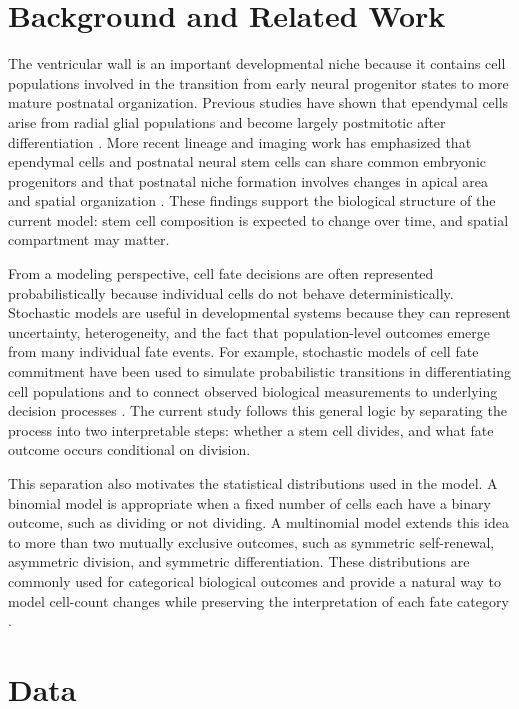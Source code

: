\documentclass[12pt]{article}
\begin{document}
\section{Background and Related Work}

The ventricular wall is an important developmental niche because it contains cell populations involved in the transition from early neural progenitor states to more mature postnatal organization. Previous studies have shown that ependymal cells arise from radial glial populations and become largely postmitotic after differentiation \citep{Spassky2005}. More recent lineage and imaging work has emphasized that ependymal cells and postnatal neural stem cells can share common embryonic progenitors and that postnatal niche formation involves changes in apical area and spatial organization \citep{Redmond2019}. These findings support the biological structure of the current model: stem cell composition is expected to change over time, and spatial compartment may matter.

From a modeling perspective, cell fate decisions are often represented probabilistically because individual cells do not behave deterministically. Stochastic models are useful in developmental systems because they can represent uncertainty, heterogeneity, and the fact that population-level outcomes emerge from many individual fate events. For example, stochastic models of cell fate commitment have been used to simulate probabilistic transitions in differentiating cell populations and to connect observed biological measurements to underlying decision processes \citep{Teles2013}. The current study follows this general logic by separating the process into two interpretable steps: whether a stem cell divides, and what fate outcome occurs conditional on division.

This separation also motivates the statistical distributions used in the model. A binomial model is appropriate when a fixed number of cells each have a binary outcome, such as dividing or not dividing. A multinomial model extends this idea to more than two mutually exclusive outcomes, such as symmetric self-renewal, asymmetric division, and symmetric differentiation. These distributions are commonly used for categorical biological outcomes and provide a natural way to model cell-count changes while preserving the interpretation of each fate category \citep{HolmesHuber2019}.

\section{Data}
\end{document}
